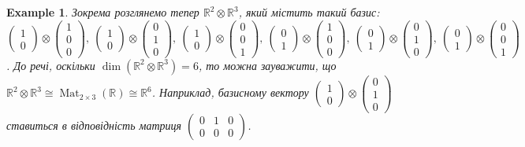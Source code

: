 \documentclass[a4paper, 10pt]{article}
\theoremstyle{theoremdd}
\newtheorem{example}[theorem]{Example}
\DeclareMathOperator{\Mat}{Mat}
\begin{document}
\begin{example}
Зокрема розглянемо тепер $\mathbb{R}^2 \otimes \mathbb{R}^3$, який містить такий базис: $\begin{pmatrix}
1 \\ 0
\end{pmatrix} \otimes \begin{pmatrix}
1 \\ 0 \\ 0
\end{pmatrix},\ \begin{pmatrix}
1 \\ 0
\end{pmatrix} \otimes \begin{pmatrix}
0 \\ 1 \\ 0
\end{pmatrix},\ \begin{pmatrix}
1 \\ 0
\end{pmatrix} \otimes \begin{pmatrix}
0 \\ 0 \\ 1
\end{pmatrix},\ \begin{pmatrix}
0 \\ 1
\end{pmatrix} \otimes \begin{pmatrix}
1 \\ 0 \\ 0
\end{pmatrix},\ \begin{pmatrix}
0 \\ 1
\end{pmatrix} \otimes \begin{pmatrix}
0 \\ 1 \\ 0
\end{pmatrix},\ \begin{pmatrix}
0 \\ 1
\end{pmatrix} \otimes \begin{pmatrix}
0 \\ 0 \\ 1
\end{pmatrix}$. До речі, оскільки $\dim (\mathbb{R}^2 \otimes \mathbb{R}^3) = 6$, то можна зауважити, що $\mathbb{R}^2 \otimes \mathbb{R}^3 \cong \Mat_{2 \times 3}(\mathbb{R}) \cong \mathbb{R}^6$. Наприклад, базисному вектору $\begin{pmatrix}
1 \\ 0
\end{pmatrix} \otimes \begin{pmatrix}
0 \\ 1 \\ 0
\end{pmatrix}$ ставиться в відповідність матриця $\begin{pmatrix}
0 & 1 & 0 \\
0 & 0 & 0
\end{pmatrix}$.
\end{example}
\end{document}
